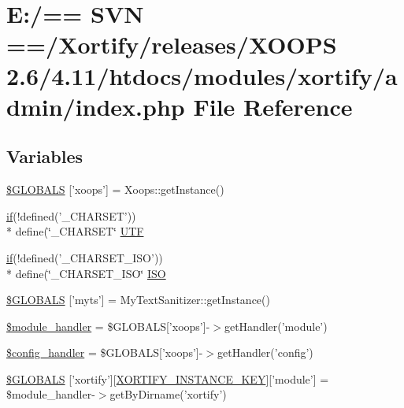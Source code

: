 \hypertarget{admin_2index_8php}{\section{E\-:/== S\-V\-N ==/\-Xortify/releases/\-X\-O\-O\-P\-S 2.6/4.11/htdocs/modules/xortify/admin/index.php File Reference}
\label{admin_2index_8php}
}
\subsection*{Variables}
\begin{DoxyCompactItemize}
\item 
\hyperlink{admin_2index_8php_ad10934112c0d18cf6b358d47afa6fcf1}{\$\-G\-L\-O\-B\-A\-L\-S} \mbox{[}'xoops'\mbox{]} = Xoops\-::get\-Instance()
\item 
\hyperlink{poll_2index_8php_ae404acbb304be6b6ac443de921697faf}{if}(!defined('\-\_\-\-C\-H\-A\-R\-S\-E\-T')) \\*
define(\char`\"{}\-\_\-\-C\-H\-A\-R\-S\-E\-T\char`\"{} \hyperlink{admin_2index_8php_a68a3115a9d21b3451b1b631ea0aa45a8}{U\-T\-F}
\item 
\hyperlink{poll_2index_8php_ae404acbb304be6b6ac443de921697faf}{if}(!defined('\-\_\-\-C\-H\-A\-R\-S\-E\-T\-\_\-\-I\-S\-O')) \\*
define(\char`\"{}\-\_\-\-C\-H\-A\-R\-S\-E\-T\-\_\-\-I\-S\-O\char`\"{} \hyperlink{admin_2index_8php_a925a4f82eb4a8af51868be3473dd6cb3}{I\-S\-O}
\item 
\hyperlink{admin_2index_8php_aea741b6e2c7fbb6439b8cdb3091591a4}{\$\-G\-L\-O\-B\-A\-L\-S} \mbox{[}'myts'\mbox{]} = My\-Text\-Sanitizer\-::get\-Instance()
\item 
\hyperlink{admin_2index_8php_afe9169534dbc3935c0823c21cfbf68bb}{\$module\-\_\-handler} = \$G\-L\-O\-B\-A\-L\-S\mbox{[}'xoops'\mbox{]}-\/$>$get\-Handler('module')
\item 
\hyperlink{admin_2index_8php_a3906023967379550e215cdec8f56ae20}{\$config\-\_\-handler} = \$G\-L\-O\-B\-A\-L\-S\mbox{[}'xoops'\mbox{]}-\/$>$get\-Handler('config')
\item 
\hyperlink{admin_2index_8php_ade93c98e293ae39806072af3365c6f0e}{\$\-G\-L\-O\-B\-A\-L\-S} \mbox{[}'xortify'\mbox{]}\mbox{[}\hyperlink{instance_8php_ad4a865d4289ea8a5a0454b65e7ea47c7}{X\-O\-R\-T\-I\-F\-Y\-\_\-\-I\-N\-S\-T\-A\-N\-C\-E\-\_\-\-K\-E\-Y}\mbox{]}\mbox{[}'module'\mbox{]} = \$module\-\_\-handler-\/$>$get\-By\-Dirname('xortify')

\end{DoxyCompactItemize}
